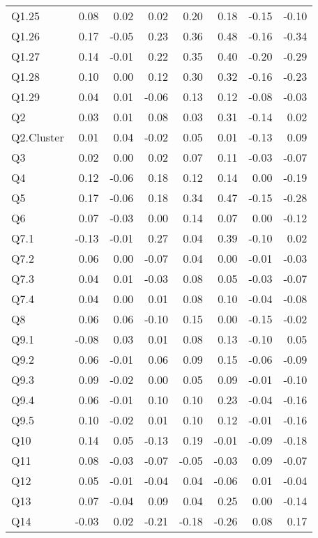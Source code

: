 \documentclass[
]{article}
\begin{document}
\begin{center}
\begin{longtable}{lrrrrrrr}
Q1.25 & 0.08 & 0.02 & 0.02 & 0.20 & 0.18 & -0.15 & -0.10\\
\addlinespace
Q1.26 & 0.17 & -0.05 & 0.23 & 0.36 & 0.48 & -0.16 & -0.34\\
Q1.27 & 0.14 & -0.01 & 0.22 & 0.35 & 0.40 & -0.20 & -0.29\\
Q1.28 & 0.10 & 0.00 & 0.12 & 0.30 & 0.32 & -0.16 & -0.23\\
Q1.29 & 0.04 & 0.01 & -0.06 & 0.13 & 0.12 & -0.08 & -0.03\\
Q2 & 0.03 & 0.01 & 0.08 & 0.03 & 0.31 & -0.14 & 0.02\\
\addlinespace
Q2.Cluster & 0.01 & 0.04 & -0.02 & 0.05 & 0.01 & -0.13 & 0.09\\
Q3 & 0.02 & 0.00 & 0.02 & 0.07 & 0.11 & -0.03 & -0.07\\
Q4 & 0.12 & -0.06 & 0.18 & 0.12 & 0.14 & 0.00 & -0.19\\
Q5 & 0.17 & -0.06 & 0.18 & 0.34 & 0.47 & -0.15 & -0.28\\
Q6 & 0.07 & -0.03 & 0.00 & 0.14 & 0.07 & 0.00 & -0.12\\
\addlinespace
Q7.1 & -0.13 & -0.01 & 0.27 & 0.04 & 0.39 & -0.10 & 0.02\\
Q7.2 & 0.06 & 0.00 & -0.07 & 0.04 & 0.00 & -0.01 & -0.03\\
Q7.3 & 0.04 & 0.01 & -0.03 & 0.08 & 0.05 & -0.03 & -0.07\\
Q7.4 & 0.04 & 0.00 & 0.01 & 0.08 & 0.10 & -0.04 & -0.08\\
Q8 & 0.06 & 0.06 & -0.10 & 0.15 & 0.00 & -0.15 & -0.02\\
\addlinespace
Q9.1 & -0.08 & 0.03 & 0.01 & 0.08 & 0.13 & -0.10 & 0.05\\
Q9.2 & 0.06 & -0.01 & 0.06 & 0.09 & 0.15 & -0.06 & -0.09\\
Q9.3 & 0.09 & -0.02 & 0.00 & 0.05 & 0.09 & -0.01 & -0.10\\
Q9.4 & 0.06 & -0.01 & 0.10 & 0.10 & 0.23 & -0.04 & -0.16\\
Q9.5 & 0.10 & -0.02 & 0.01 & 0.10 & 0.12 & -0.01 & -0.16\\
\addlinespace
Q10 & 0.14 & 0.05 & -0.13 & 0.19 & -0.01 & -0.09 & -0.18\\
Q11 & 0.08 & -0.03 & -0.07 & -0.05 & -0.03 & 0.09 & -0.07\\
Q12 & 0.05 & -0.01 & -0.04 & 0.04 & -0.06 & 0.01 & -0.04\\
Q13 & 0.07 & -0.04 & 0.09 & 0.04 & 0.25 & 0.00 & -0.14\\
Q14 & -0.03 & 0.02 & -0.21 & -0.18 & -0.26 & 0.08 & 0.17\\

\end{longtable}
\end{center}
\end{document}

